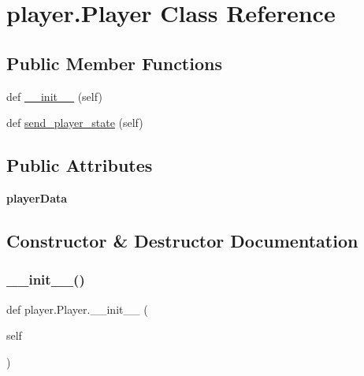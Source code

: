 \hypertarget{classplayer_1_1_player}{}\section{player.\+Player Class Reference}
\label{classplayer_1_1_player}
\subsection*{Public Member Functions}
\begin{DoxyCompactItemize}
\item 
def \hyperlink{classplayer_1_1_player_a208e7d0ae3cef2a90515526ac7cd0c26}{\+\_\+\+\_\+init\+\_\+\+\_\+} (self)
\item 
def \hyperlink{classplayer_1_1_player_a7f6ef8ead0059a55c2545ec110f3e53a}{send\+\_\+player\+\_\+state} (self)
\end{DoxyCompactItemize}
\subsection*{Public Attributes}
\begin{DoxyCompactItemize}
\item 
\mbox{\label{classplayer_1_1_player_a2fdcd9239e3f8eb66cf2597160d04c2c}} 
{\bfseries player\+Data}
\end{DoxyCompactItemize}


\subsection{Constructor \& Destructor Documentation}
\mbox{\label{classplayer_1_1_player_a208e7d0ae3cef2a90515526ac7cd0c26}} 
\subsubsection{\texorpdfstring{\+\_\+\+\_\+init\+\_\+\+\_\+()}{\_\_init\_\_()}}
{\footnotesize\ttfamily def player.\+Player.\+\_\+\+\_\+init\+\_\+\+\_\+ (\begin{DoxyParamCaption}\item[{}]{self }\end{DoxyParamCaption})}

